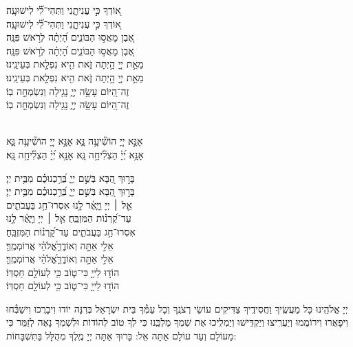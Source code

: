 \documentclass[twoside, openany, parskip=half, 11pt]{book}
\begin{document}
{\begin{narrow}
א֭וֹדְךָ כִּ֣י עֲנִיתָ֑נִי \hfill וַתְּהִי־לִ֗֝י לִישׁוּעָֽה׃ \\
\scriptsize{ א֭וֹדְךָ כִּ֣י עֲנִיתָ֑נִי \hfill וַתְּהִי־לִ֗֝י לִישׁוּעָֽה׃ \\}\normalsize{}
אֶ֭בֶן מָאֲס֣וּ הַבּוֹנִ֑ים \hfill הָ֝יְתָ֗ה לְרֹ֣אשׁ פִּנָּֽה׃ \\
\scriptsize{ אֶ֭בֶן מָאֲס֣וּ הַבּוֹנִ֑ים \hfill הָ֝יְתָ֗ה לְרֹ֣אשׁ פִּנָּֽה׃ \\}\normalsize{}
מֵאֵ֣ת יְיָ֭ הָ֣יְתָה זֹּ֑את \hfill הִ֖יא נִפְלָ֣את בְּעֵינֵֽינוּ׃ \\
\scriptsize{ מֵאֵ֣ת יְיָ֭ הָ֣יְתָה זֹּ֑את \hfill הִ֖יא נִפְלָ֣את בְּעֵינֵֽינוּ׃ \\}\normalsize{}
זֶה־הַ֭יּוֹם עָשָׂ֣ה יְיָ֑ \hfill נָגִ֖ילָה וְנִשְׂמְחָ֣ה בֽוֹ׃ \\
\scriptsize{ זֶה־הַ֭יּוֹם עָשָׂ֣ה יְיָ֑ \hfill נָגִ֖ילָה וְנִשְׂמְחָ֣ה בֽוֹ׃ } \normalsize{}


\\
אָנָּ֣א יְיָ֭ הוֹשִׁ֘יעָ֥ה נָּ֑א \hfill \scriptsize{אָנָּ֣א יְיָ֭ הוֹשִׁ֘יעָ֥ה נָּ֑א}\\ \normalsize
אָנָּ֥א יְ֝יָ֗ הַצְלִ֘יחָ֥ה נָּֽא \hfill \scriptsize{ אָנָּ֥א יְ֝יָ֗ הַצְלִ֘יחָ֥ה נָּֽא׃}\\ \normalsize


בָּר֣וּךְ הַ֭בָּא בְּשֵׁ֣ם יְיָ֑ \hfill בֵּ֝רַ֥כְנוּכֶ֗ם מִבֵּ֥ית יְיָ׃\\
\scriptsize{בָּר֣וּךְ הַ֭בָּא בְּשֵׁ֣ם יְיָ֑ \hfill בֵּ֝רַ֥כְנוּכֶ֗ם מִבֵּ֥ית יְיָ׃}\\
\normalsize{אֵ֤ל ׀ יְיָ וַיָּ֢אֶ֫ר לָ֥נוּ \hfill אִסְרוּ־חַ֥ג בַּעֲבֹתִ֑ים \\ עַד־קַ֝רְנ֗וֹת הַמִּזְבֵּֽחַ׃ \hfill }
\scriptsize{אֵ֤ל ׀ יְיָ וַיָּ֢אֶ֫ר לָ֥נוּ \\ אִסְרוּ־חַ֥ג בַּעֲבֹתִ֑ים \hfill עַד־קַ֝רְנ֗וֹת הַמִּזְבֵּֽחַ׃}\\
\normalsize{אֵלִ֣י אַתָּ֣ה וְאוֹדֶ֑ךָּ\hfill אֱ֝לֹהַ֗י אֲרוֹמְמֶֽךָּ׃}\\
\scriptsize{אֵלִ֣י אַתָּ֣ה וְאוֹדֶ֑ךָּ\hfill אֱ֝לֹהַ֗י אֲרוֹמְמֶֽךָּ׃}\\
\normalsize{הוֹד֣וּ לַייָ֣ כִּי־ט֑וֹב \hfill כִּ֖י לְעוֹלָ֣ם חַסְדּֽוֹ׃ }\\
\scriptsize{הוֹד֣וּ לַייָ֣ כִּי־ט֑וֹב \hfill כִּ֖י לְעוֹלָ֣ם חַסְדּֽוֹ׃ } \\
\normalsize{}

\end{narrow}

\negline

יְיָ אֱלֹהֵֽינוּ כָּל מַעֲשֶֽׂיךָ וַחֲסִידֶֽיךָ צַדִּיקִים עוֹשֵׂי רְצֹנֶֽךָ וְכָל עַמְּ֯ךָ בֵּית יִשְׂרָאֵל בְּרִנָּה יוֹדוּ וִיבָרֲכוּ וִישַׁבְּ֯חוּ וִיפָאֲרוּ וִירוֹמֲמוּ וְיַעֲרִֽיצוּ וְיַקְדִּֽישׁוּ וְיַמְלִֽיכוּ אֶת שִׁמְךָ מַלְכֵּֽנוּ כִּי לְךָ טוֹב לְהוֹדוֹת וּלְשִׁמְךָ נָאֶה לְזַמֵּר כִּי מֵעוֹלָם וְעַד עוֹלָם אַתָּה אֵל: בָּרוּךְ אַתָּה יְיָ מֶֽלֶךְ מְהֻלָּל בַּתִּשְׁבָּחוֹת:
}
\end{document}
